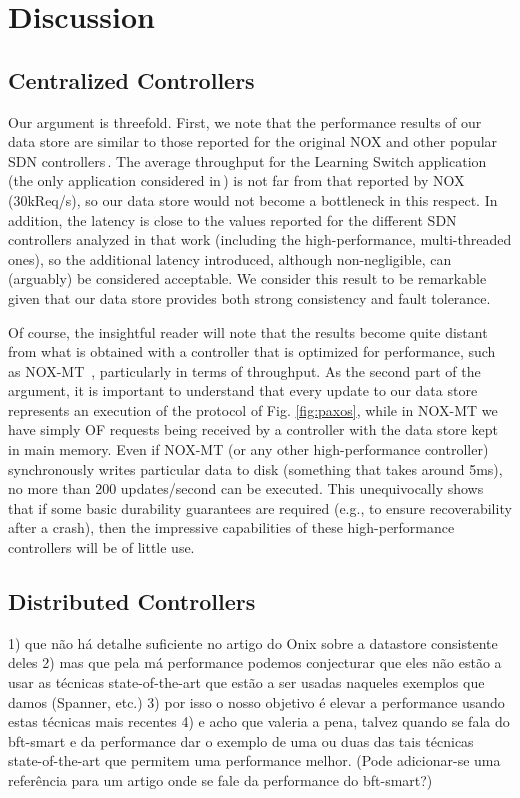 
\section{Discussion}

\subsection{Centralized Controllers}

Our argument is threefold.
First, we note that the performance results of our data store are similar to those reported for the original NOX and other popular SDN controllers\,\cite{Tootoonchian:2012:CPS:2228283.2228297}.
The average throughput for the Learning Switch application (the only application considered in\,\cite{Tootoonchian:2012:CPS:2228283.2228297}) is not far from that reported by NOX (30kReq/s), so our data store would not become a bottleneck in this respect.
In addition, the latency is close to the values reported for the different SDN controllers analyzed in that work (including the high-performance, multi-threaded ones), so the additional latency introduced, although non-negligible, can (arguably) be considered acceptable.
We consider this result to be remarkable given that our data store provides both strong consistency and fault tolerance.

Of course, the insightful reader will note that the results become quite distant from what is obtained with a controller that is optimized for performance, such as NOX-MT~\cite{Tootoonchian:2012:CPS:2228283.2228297}, particularly in terms of throughput.
As the second part of the argument, it is important to understand that every update to our data store represents an execution of the protocol of Fig. \ref{fig:paxos}, while in NOX-MT we have simply OF requests being received by a controller with the data store kept in main memory.
Even if NOX-MT (or any other high-performance controller) synchronously writes particular data to disk (something that takes around 5ms), no more than 200 updates/second can be executed.
This unequivocally shows that if some basic durability guarantees are required (e.g., to ensure recoverability after a crash), then the impressive capabilities of these high-performance controllers will be of little use.

\subsection{Distributed Controllers}

1) que não há detalhe suficiente no artigo do Onix sobre a datastore
consistente deles
2) mas que pela má performance podemos conjecturar que eles não estão a usar
as técnicas state-of-the-art que estão a ser usadas naqueles exemplos que
damos (Spanner, etc.)
3) por isso o nosso objetivo é elevar a performance usando estas técnicas
mais recentes
4) e acho que valeria a pena, talvez quando se fala do bft-smart e da
performance dar o exemplo de uma ou duas das tais técnicas state-of-the-art
que permitem uma performance melhor. (Pode adicionar-se uma referência para
um artigo onde se fale da performance do bft-smart?)


